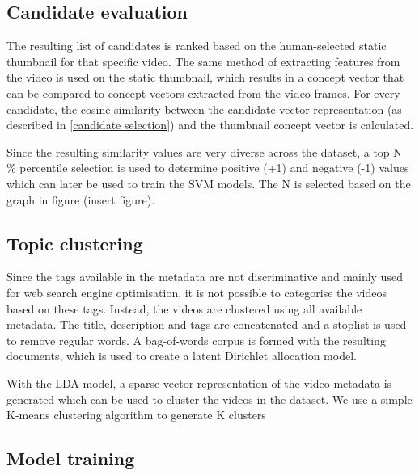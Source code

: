 \documentclass{../resources/acm_proc_article-sp}
\begin{document}
\subsection{Candidate evaluation}



The resulting list of candidates is ranked based on the human-selected static thumbnail for that specific video. The same method of extracting features from the video is used on the static thumbnail, which results in a concept vector that can be compared to concept vectors extracted from the video frames. For every candidate, the cosine similarity between the candidate vector representation (as described in \ref{candidate selection}) and the thumbnail concept vector is calculated. 

Since the resulting similarity values are very diverse across the dataset, a top N \% percentile selection is used to determine positive (+1) and negative (-1) values which can later be used to train the SVM models. The N is selected based on the graph in figure (insert figure).

\subsection{Topic clustering}




Since the tags available in the metadata are not discriminative and mainly used for web search engine optimisation, it is not possible to categorise the videos based on these tags. Instead, the videos are clustered using all available metadata. The title, description and tags are concatenated and a stoplist is used to remove regular words. A bag-of-words corpus is formed with the resulting documents, which is used to create a latent Dirichlet allocation model.

With the LDA model, a sparse vector representation of the video metadata is generated which can be used to cluster the videos in the dataset. We use a simple K-means clustering algorithm to generate K clusters



\subsection{Model training}
\end{document}
